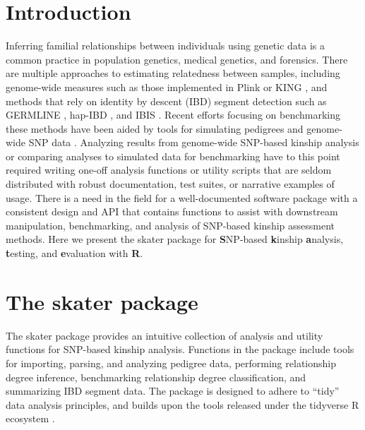 \documentclass{bioinfo}
\begin{document}
\maketitle

\section{Introduction}

Inferring familial relationships between individuals using genetic data
is a common practice in population genetics, medical genetics, and
forensics. There are multiple approaches to estimating relatedness
between samples, including genome-wide measures such as those
implemented in Plink \citep{purcell2007} or KING
\citep{manichaikul2010}, and methods that rely on identity by descent
(IBD) segment detection such as GERMLINE \citep{gusev2009}, hap-IBD
\citep{zhou2020}, and IBIS \citep{seidman2020}. Recent efforts focusing
on benchmarking these methods \citep{ramstetter2017, vries2021} have
been aided by tools for simulating pedigrees and genome-wide SNP data
\citep{caballero2019}. Analyzing results from genome-wide SNP-based
kinship analysis or comparing analyses to simulated data for
benchmarking have to this point required writing one-off analysis
functions or utility scripts that are seldom distributed with robust
documentation, test suites, or narrative examples of usage. There is a
need in the field for a well-documented software package with a
consistent design and API that contains functions to assist with
downstream manipulation, benchmarking, and analysis of SNP-based kinship
assessment methods. Here we present the skater package for
\textbf{S}NP-based \textbf{k}inship \textbf{a}nalysis, \textbf{t}esting,
and \textbf{e}valuation with \textbf{R}.

\section{The skater package}

The skater package provides an intuitive collection of analysis and
utility functions for SNP-based kinship analysis. Functions in the
package include tools for importing, parsing, and analyzing pedigree
data, performing relationship degree inference, benchmarking
relationship degree classification, and summarizing IBD segment data.
The package is designed to adhere to ``tidy'' data analysis principles,
and builds upon the tools released under the tidyverse R ecosystem
\citep{Wickham2019}.
\end{document}
